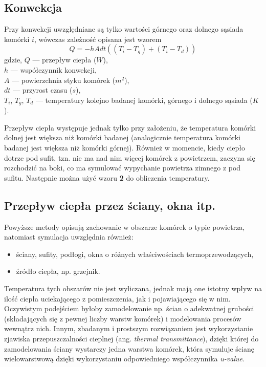 \documentclass{article}
\begin{document}
\subsection{Konwekcja}
Przy konwekcji uwzględniane są tylko wartości górnego oraz dolnego sąsiada komórki $i$, wówczas zależność opisana jest wzorem
\begin{equation}
Q= -hA dt ((T_i - T_g) + (T_i - T_d))
\end{equation}
gdzie,
$Q$ --- przepływ ciepła ($W$), \\
$h$ --- współczynnik konwekcji, \\
$A$ --- powierzchnia styku komórek ($m^2$), \\
$dt$ --- przyrost czasu ($s$), \\
$T_i$, $T_g$, $T_d$ --- temperatury kolejno badanej komórki, górnego i dolnego sąsiada ($K$).

Przepływ ciepła występuje jednak tylko przy założeniu, że temperatura komórki dolnej jest większa niż komórki badanej (analogicznie
temperatura komórki badanej jest większa niż komórki górnej). Również w momencie, kiedy ciepło dotrze pod sufit, tzn. nie ma nad
nim więcej komórek z powietrzem, zaczyna się rozchodzić na boki, co ma symulować wypychanie powietrza zimnego z pod sufitu. 
Następnie można użyć wzoru \textbf{2} do obliczenia temperatury.

\subsection{Przepływ ciepła przez ściany, okna itp.}
Powyższe metody opisują zachowanie w obszarze komórek o typie powietrza, natomiast symulacja uwzględnia również:
\begin{itemize}
    \item 
    ściany, sufity, podłogi, okna o różnych właściwościach termoprzewodzących,
    \item
    źródło ciepła, np. grzejnik.
\end{itemize}

Temperatura tych obszarów nie jest wyliczana, jednak mają one istotny wpływ na ilość ciepła uciekającego z pomieszczenia, jak
i pojawiającego się w nim. Oczywistym podejściem byłoby zamodelowanie np. ścian o adekwatnej grubości (składających się 
z pewnej liczby warstw komórek) i modelowania procesów wewnątrz nich. Innym, zbadanym i prostszym rozwiązaniem jest wykorzystanie
zjawiska przepuszczalności cieplnej (ang. \textit{thermal transmittance}), dzięki której do zamodelowania ściany wystarczy
jedna warstwa komórek, która symuluje ścianę wielowarstwową dzięki wykorzystaniu odpowiedniego współczynnika \textit{u-value}.
\end{document}
